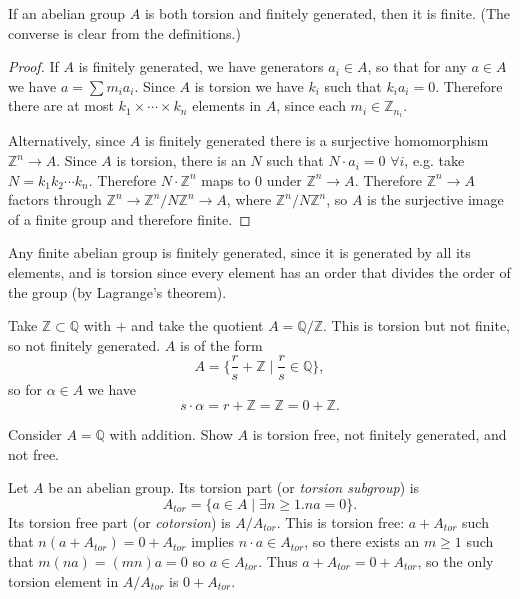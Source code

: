 \begin{obsv}
If an abelian group $A$ is both torsion and finitely generated, then
it is finite. (The converse is clear from the definitions.)
\end{obsv}
\begin{proof}
If $A$ is finitely generated, we have generators $a_i \in A$, so that
for any $a \in A$ we have $a = \sum m_i a_i$.
Since $A$ is torsion we have $k_i$ such that $k_i a_i = 0$. Therefore
there are at most $k_1 \times \cdots \times k_n$ elements in $A$,
since each $m_i \in \mathbb{Z}_{n_i}$.

Alternatively, since $A$ is finitely generated there is a surjective
homomorphism $\mathbb{Z}^n \to A$. Since $A$ is torsion, there is an
$N$ such that $N \cdot a_i = 0$ $\forall i$, e.g. take
$N = k_1 k_2 \cdots k_n$. Therefore $N \cdot \mathbb{Z}^n$ maps to $0$
under $\mathbb{Z}^n \to A$. Therefore $\mathbb{Z}^n \to A$ factors
through $\mathbb{Z}^n \to \mathbb{Z}^n / N \mathbb{Z}^n \to A$, where
$\mathbb{Z}^n / N \mathbb{Z}^n$, so $A$ is the surjective image of a
finite group and therefore finite.
\end{proof}

\begin{obsv}
Any finite abelian group is finitely generated, since it is generated by all
its elements, and is torsion since every element has an order that
divides the order of the group (by Lagrange's theorem).
\end{obsv}

\begin{xmpl}
Take $\mathbb{Z} \subset \mathbb{Q}$ with $+$ and take the quotient
$A = \mathbb{Q} / \mathbb{Z}$. This is torsion but not finite, so not
finitely generated. $A$ is of the form
$$
A = \{ \frac{r}{s} + \mathbb{Z} \mid \frac{r}{s} \in \mathbb{Q} \},
$$
so for $\alpha \in A$ we have
$$
s \cdot \alpha = r + \mathbb{Z} = \mathbb{Z} = 0 + \mathbb{Z}.
$$
\end{xmpl}

\begin{exer}
Consider $A = \mathbb{Q}$ with addition. Show $A$ is torsion free, not
finitely generated, and not free.
\end{exer}

\begin{defn}
Let $A$ be an abelian group. Its torsion part (or \emph{torsion
  subgroup}) is
$$
A_{tor} = \{ a \in A \mid \exists n \geq 1 . n a = 0 \}.
$$
Its torsion free part (or \emph{cotorsion}) is
$A / A_{tor}$. This is torsion free:
$a + A_{tor}$ such that $n(a + A_{tor}) = 0 + A_{tor}$ implies $n
\cdot a \in A_{tor}$, so there exists an $m \geq 1$ such that
$m(na) = (mn)a = 0$ so $a \in A_{tor}$. Thus $a + A_{tor} = 0 +
A_{tor}$, so the only torsion element in $A / A_{tor}$ is
$0 + A_{tor}$.
\end{defn}


